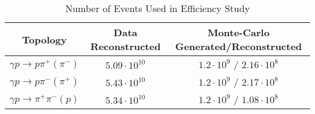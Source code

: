 \begin{table}[h!]
\begin{minipage}{\textwidth}
\begin{center}


\caption[Number of Events Used in Efficiency Study]{\label{tab:eff_events}Number of Events Used in Efficiency Study \vspace{0.75mm}}

\begin{tabular}{c|c|c}

\hline
Topology & Data Reconstructed & Monte-Carlo Generated/Reconstructed \\
\hline
$\gamma p \rightarrow p \pi^+ (\pi^-)$ & $5.09\cdot10^{10}$ & $1.2\cdot10^9$ / $2.16\cdot10^8$ \\
$\gamma p \rightarrow p \pi^- (\pi^+)$ & $5.43\cdot10^{10}$ & $1.2\cdot10^9$ / $2.17\cdot10^8$ \\
$\gamma p \rightarrow \pi^+ \pi^- (p)$ & $5.34\cdot10^{10}$ & $1.2\cdot10^9$ / $1.08\cdot10^8$ \\
\hline \hline
\end{tabular}


\end{center}
\end{minipage}
\end{table}
\vspace{20pt}